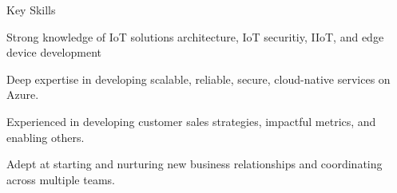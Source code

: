 \documentclass{resume} %
\begin{document}
\begin{rSection}{Key Skills}
\begin{rSubsectionNoTitle}
\item Strong knowledge of IoT solutions architecture, IoT securitiy, IIoT, and edge device development
\item Deep expertise in developing scalable, reliable, secure, cloud-native services on Azure.
\item Experienced in developing customer sales strategies, impactful metrics, and enabling others.
\item Adept at starting and nurturing new business relationships and coordinating across multiple teams.
\end{rSubsectionNoTitle}
\end{rSection}
    
\end{document}
